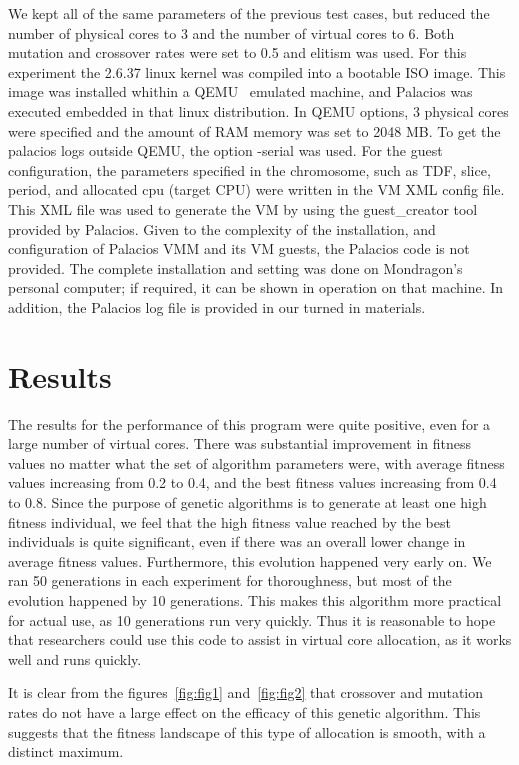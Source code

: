 \documentclass[11pt]{article}
\begin{document}
We kept all of the same parameters of the previous test cases, but reduced the number of physical cores to 3 and the number of virtual cores to 6. Both mutation and crossover rates were set to 0.5 and elitism was used. For this experiment the 2.6.37 linux kernel was compiled into a bootable ISO image. This image was installed whithin a QEMU~\cite{Bellard:2005} emulated machine, and Palacios was executed embedded in that linux distribution. In QEMU options, 3 physical cores were specified and the amount of RAM memory was set to 2048 MB. To get the palacios logs outside QEMU, the option -serial was used. For the guest configuration, the parameters specified in the chromosome, such as TDF, slice, period, and allocated cpu (target CPU) were written in the VM XML config file. This XML file was used to generate the VM by using the guest\_creator tool provided by Palacios. Given to the complexity of the installation, and configuration of Palacios VMM and its VM guests, the Palacios code is not provided. The complete installation and setting was done on Mondragon's personal computer; if required, it can be shown in operation on that machine. In addition, the Palacios log file is provided in our turned in materials.

\section{Results}

The results for the performance of this program were quite positive, even for a large number of virtual cores. There was substantial improvement in fitness values no matter what the set of algorithm parameters were, with average fitness values increasing from 0.2 to 0.4, and the best fitness values increasing from 0.4 to 0.8. Since the purpose of genetic algorithms is to generate at least one high fitness individual, we feel that the high fitness value reached by the best individuals is quite significant, even if there was an overall lower change in average fitness values. Furthermore, this evolution happened very early on. We ran 50 generations in each experiment for thoroughness, but most of the evolution happened by 10 generations. This makes this algorithm more practical for actual use, as 10 generations run very quickly. Thus it is reasonable to hope that researchers could use this code to assist in virtual core allocation, as it works well and runs quickly. 

It is clear from the figures~\ref{fig:fig1} and~\ref{fig:fig2} that crossover and mutation rates do not have a large effect on the efficacy of this genetic algorithm. This suggests that the fitness landscape of this type of allocation is smooth, with a distinct maximum. 
\end{document}
